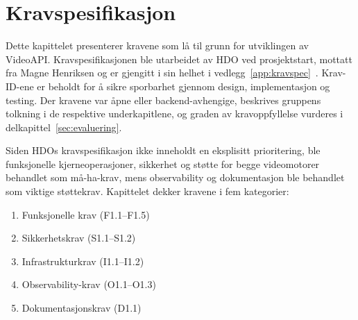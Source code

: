 \chapter{Kravspesifikasjon}
\label{ch:krav}

Dette kapittelet presenterer kravene som lå til grunn for utviklingen av VideoAPI. Kravspesifikasjonen ble utarbeidet av HDO ved prosjektstart, mottatt fra Magne Henriksen og er gjengitt i sin helhet i vedlegg~\ref{app:kravspec}~\cite{hdo_kravspec}. Krav-ID-ene er beholdt for å sikre sporbarhet gjennom design, implementasjon og testing. Der kravene var åpne eller backend-avhengige, beskrives gruppens tolkning i de respektive underkapitlene, og graden av kravoppfyllelse vurderes i delkapittel~\ref{sec:evaluering}.

Siden HDOs kravspesifikasjon ikke inneholdt en eksplisitt prioritering, ble funksjonelle kjerneoperasjoner, sikkerhet og støtte for begge videomotorer behandlet som må-ha-krav, mens observability og dokumentasjon ble behandlet som viktige støttekrav. Kapittelet dekker kravene i fem kategorier:




\begin{enumerate}
    \item Funksjonelle krav (F1.1--F1.5)
    \item Sikkerhetskrav (S1.1--S1.2)
    \item Infrastrukturkrav (I1.1--I1.2)
    \item Observability-krav (O1.1--O1.3)
    \item Dokumentasjonskrav (D1.1)
\end{enumerate}

